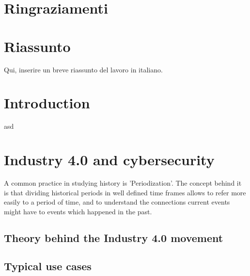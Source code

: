 \documentclass[a4paper, 12pt]{book}
\begin{document}
\pagestyle{empty}
\clearpage
\tableofcontents
\thispagestyle{empty}

\chapter{Ringraziamenti}


\chapter{Riassunto}

Qui, inserire un breve riassunto del lavoro in italiano.


\chapter{Introduction}
\pagestyle{fancy}
\fancyhf{}
\renewcommand{\headrulewidth}{2pt}
\fancyhead[EL]{\textbf{\textsf{\nouppercase\thepage}}}
\fancyhead[ER]{\textbf{\textsf{\nouppercase\leftmark}}}
\fancyhead[OR]{\textbf{\textsf{\nouppercase\thepage}}}
\fancyhead[OL]{\textbf{\textsf{\nouppercase {\rightmark}}}}

\thispagestyle{empty}

asd
\newpage

\chapter{Industry 4.0 and cybersecurity}
A common practice in studying history is 'Periodization'. The concept behind it is that dividing historical periods in well defined time frames allows to refer more easily to a period of time, and to understand the connections current events might have to events which happened in the past.


\section{Theory behind the Industry 4.0 movement}
\section{Typical use cases}
\end{document}
